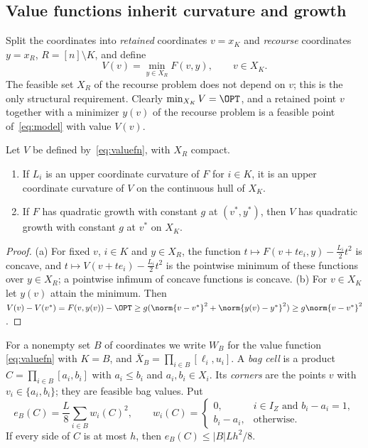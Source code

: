 \subsection{Value functions inherit curvature and growth}\label{sec:valuefn}
Split the coordinates into \emph{retained} coordinates $v=x_K$ and
\emph{recourse} coordinates $y=x_R$, $R=[n]\setminus K$, and define
\begin{equation}\label{eq:valuefn}
V(v)=\min_{y\in X_R}F(v,y),\qquad v\in X_K .
\end{equation}
The feasible set $X_R$ of the recourse problem does not depend on $v$; this
is the only structural requirement. Clearly $\min_{X_K}V=\OPT$, and a
retained point $v$ together with a minimizer $y(v)$ of the recourse problem
is a feasible point of~\eqref{eq:model} with value $V(v)$.

\begin{lemma}\label{lem:valuefunction}
Let $V$ be defined by~\eqref{eq:valuefn}, with $X_R$ compact.
\begin{enumerate}[label=(\alph*)]
\item If $L_i$ is an upper coordinate curvature of $F$ for $i\in K$, it is
an upper coordinate curvature of $V$ on the continuous hull of $X_K$.
\item If $F$ has quadratic growth with constant $g$ at $(v^*,y^*)$, then $V$
has quadratic growth with constant $g$ at $v^*$ on $X_K$.
\end{enumerate}
\end{lemma}

\begin{proof}
(a) For fixed $v$, $i\in K$ and $y\in X_R$, the function
$t\mapsto F(v+te_i,y)-\frac{L_i}{2}t^2$ is concave, and
$t\mapsto V(v+te_i)-\frac{L_i}{2}t^2$ is the pointwise minimum of these
functions over $y\in X_R$; a pointwise infimum of concave functions is
concave. (b) For $v\in X_K$ let $y(v)$ attain the minimum. Then
$V(v)-V(v^*)=F(v,y(v))-\OPT\ge g(\norm{v-v^*}^2+\norm{y(v)-y^*}^2)\ge
g\norm{v-v^*}^2$.
\end{proof}

For a nonempty set $B$ of coordinates we write $W_B$ for the value function
\eqref{eq:valuefn} with $K=B$, and $\bar X_B=\prod_{i\in B}[\ell_i,u_i]$.
A \emph{bag cell} is a product $C=\prod_{i\in B}[a_i,b_i]$ with
$a_i\le b_i$ and $a_i,b_i\in X_i$. Its \emph{corners} are the points $v$
with $v_i\in\{a_i,b_i\}$; they are feasible bag values. Put
\[
e_B(C)=\frac L8\sum_{i\in B}w_i(C)^2,\qquad
w_i(C)=\begin{cases}
0,& i\in I_Z\text{ and }b_i-a_i=1,\\
b_i-a_i,&\text{otherwise.}
\end{cases}
\]
If every side of $C$ is at most $h$, then $e_B(C)\le|B|Lh^2/8$.

